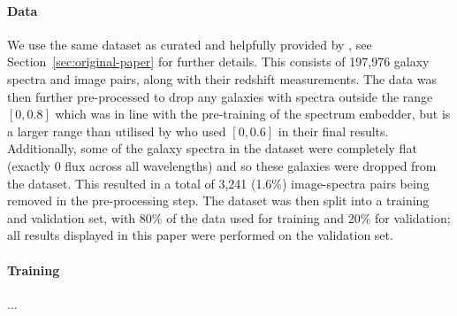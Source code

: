 \paragraph{Data} We use the same dataset as curated and helpfully provided by \cite{astroclip}, see Section~\eqref{sec:original-paper}
for further details.
This consists of 197,976 galaxy spectra and image pairs, along with their redshift measurements.
The data was then further pre-processed to drop any galaxies with spectra outside the range $[0, 0.8]$ which was in line with the
pre-training of the spectrum embedder, but is a larger range than utilised by \cite{astroclip} who used $[0, 0.6]$ in their final results.
Additionally, some of the galaxy spectra in the dataset were completely flat (exactly 0 flux across all wavelengths)
and so these galaxies were dropped from the dataset.
This resulted in a total of 3,241 (1.6\%) image-spectra pairs being removed in the pre-processing step.
The dataset was then split into a training and validation set, with 80\% of the data used for training and 20\% for
validation; all results displayed in this paper were performed on the validation set.

\paragraph{Training} ...
